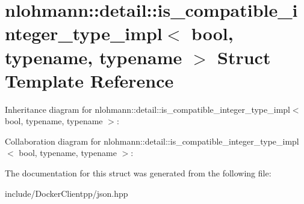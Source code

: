 \hypertarget{structnlohmann_1_1detail_1_1is__compatible__integer__type__impl}{}\section{nlohmann\+::detail\+::is\+\_\+compatible\+\_\+integer\+\_\+type\+\_\+impl$<$ bool, typename, typename $>$ Struct Template Reference}
\label{structnlohmann_1_1detail_1_1is__compatible__integer__type__impl}


Inheritance diagram for nlohmann\+::detail\+::is\+\_\+compatible\+\_\+integer\+\_\+type\+\_\+impl$<$ bool, typename, typename $>$\+:


Collaboration diagram for nlohmann\+::detail\+::is\+\_\+compatible\+\_\+integer\+\_\+type\+\_\+impl$<$ bool, typename, typename $>$\+:


The documentation for this struct was generated from the following file\+:\begin{DoxyCompactItemize}
\item 
include/\+Docker\+Clientpp/json.\+hpp\end{DoxyCompactItemize}
